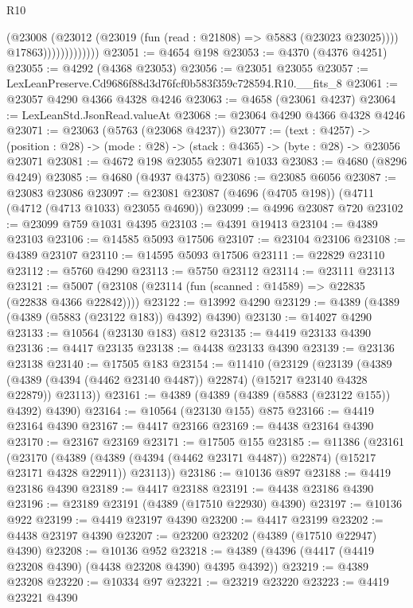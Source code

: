 \begin{lexlean}{R10}
\begin{coremodule}
                            (@23008
                              (@23012 (@23019 (fun (read : @21808) => @5883 (@23023 @23025))))
                              @17863)))))))))))))
@23051 := @4654 @198
@23053 := @4370 (@4376 @4251)
@23055 := @4292 (@4368 @23053)
@23056 := @23051 @23055
@23057 := LexLeanPreserve.Cd9686f88d3d76fcf0b583f359c728594.R10.__fits_8
@23061 := @23057 @4290 @4366 @4328 @4246
@23063 := @4658 (@23061 @4237)
@23064 := LexLeanStd.JsonRead.valueAt
@23068 := @23064 @4290 @4366 @4328 @4246
@23071 := @23063 (@5763 (@23068 @4237))
@23077 := (text : @4257) ->
  (position : @28) -> (mode : @28) -> (stack : @4365) -> (byte : @28) -> @23056 @23071
@23081 := @4672 @198 @23055 @23071 @1033
@23083 := @4680 (@8296 @4249)
@23085 := @4680 (@4937 @4375)
@23086 := @23085 @6056
@23087 := @23083 @23086
@23097 := @23081 @23087 (@4696 (@4705 @198)) (@4711 (@4712 (@4713 @1033) @23055 @4690))
@23099 := @4996 @23087 @720
@23102 := @23099 @759 @1031 @4395
@23103 := @4391 @19413
@23104 := @4389 @23103
@23106 := @14585 @5093 @17506
@23107 := @23104 @23106
@23108 := @4389 @23107
@23110 := @14595 @5093 @17506
@23111 := @22829 @23110
@23112 := @5760 @4290
@23113 := @5750 @23112
@23114 := @23111 @23113
@23121 := @5007 (@23108 (@23114 (fun (scanned : @14589) => @22835 (@22838 @4366 @22842))))
@23122 := @13992 @4290
@23129 := @4389 (@4389 (@4389 (@5883 (@23122 @183)) @4392) @4390)
@23130 := @14027 @4290
@23133 := @10564 (@23130 @183) @812
@23135 := @4419 @23133 @4390
@23136 := @4417 @23135
@23138 := @4438 @23133 @4390
@23139 := @23136 @23138
@23140 := @17505 @183
@23154 := @11410
    (@23129
      (@23139
        (@4389 (@4389 (@4394 (@4462 @23140 @4487)) @22874) (@15217 @23140 @4328 @22879))
        @23113))
@23161 := @4389 (@4389 (@4389 (@5883 (@23122 @155)) @4392) @4390)
@23164 := @10564 (@23130 @155) @875
@23166 := @4419 @23164 @4390
@23167 := @4417 @23166
@23169 := @4438 @23164 @4390
@23170 := @23167 @23169
@23171 := @17505 @155
@23185 := @11386
    (@23161
      (@23170
        (@4389 (@4389 (@4394 (@4462 @23171 @4487)) @22874) (@15217 @23171 @4328 @22911))
        @23113))
@23186 := @10136 @897
@23188 := @4419 @23186 @4390
@23189 := @4417 @23188
@23191 := @4438 @23186 @4390
@23196 := @23189 @23191 (@4389 (@17510 @22930) @4390)
@23197 := @10136 @922
@23199 := @4419 @23197 @4390
@23200 := @4417 @23199
@23202 := @4438 @23197 @4390
@23207 := @23200 @23202 (@4389 (@17510 @22947) @4390)
@23208 := @10136 @952
@23218 := @4389 (@4396 (@4417 (@4419 @23208 @4390) (@4438 @23208 @4390) @4395 @4392))
@23219 := @4389 @23208
@23220 := @10334 @97
@23221 := @23219 @23220
@23223 := @4419 @23221 @4390

\end{coremodule}
\end{lexlean}
